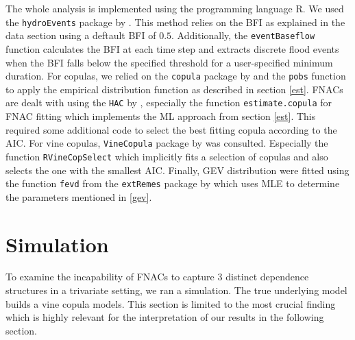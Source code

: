 \documentclass[
]{krantz}
\begin{document}
The whole analysis is implemented using the programming language R.
We used the \texttt{hydroEvents} package by \citet{wasko2025}.
This method relies on the BFI as explained in the data section using a deftault BFI of \(0.5\).
Additionally, the \texttt{eventBaseflow} function calculates the BFI at each time step and extracts discrete flood events when the BFI falls below the specified threshold for a user-specified minimum duration.
For copulas, we relied on the \texttt{copula} package by
\citet{hofert2025} and the \texttt{pobs} function to apply the empirical distribution function as described in section \ref{est}.
FNACs are dealt with using the
\texttt{HAC} by \citet{okhrin2014}, especially the
function
\texttt{estimate.copula} for FNAC fitting which implements the ML approach from section \ref{est}. This required
some additional code to select the best fitting copula according to the AIC.
For vine copulas,
\texttt{VineCopula} package by \citet{nagler2024} was consulted.
Especially the function
\texttt{RVineCopSelect} which implicitly fits a selection of copulas and also selects the one with the smallest AIC.
Finally, GEV distribution were fitted using the function
\texttt{fevd} from the
\texttt{extRemes} package by \citet{gilleland2016} which uses MLE to determine the parameters mentioned in \ref{gev}.

\section{Simulation}\label{sim}

To examine the incapability of FNACs to capture \(3\) distinct dependence structures in a trivariate
setting, we ran a simulation.
The true underlying model builds a vine copula models.
This section is limited to the most crucial finding
which is highly relevant for the interpretation of our results in the following section.
\end{document}
